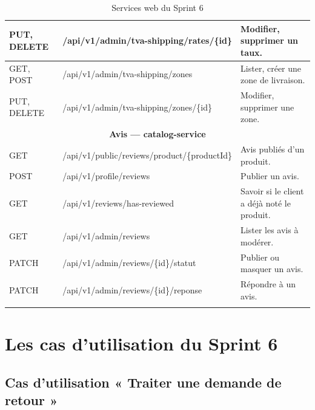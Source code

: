 \begin{longtable}{|p{2cm}|p{8.8cm}|p{4.2cm}|}
\hline
PUT, DELETE & /api/v1/admin/tva-shipping/rates/\{id\} & Modifier, supprimer un taux. \\
\hline
GET, POST & /api/v1/admin/tva-shipping/zones & Lister, créer une zone de livraison. \\
\hline
PUT, DELETE & /api/v1/admin/tva-shipping/zones/\{id\} & Modifier, supprimer une zone. \\
\hline
\multicolumn{3}{|c|}{\textbf{Avis --- catalog-service}} \\
\hline
GET & /api/v1/public/reviews/product/\{productId\} & Avis publiés d'un produit. \\
\hline
POST & /api/v1/profile/reviews & Publier un avis. \\
\hline
GET & /api/v1/reviews/has-reviewed & Savoir si le client a déjà noté le produit. \\
\hline
GET & /api/v1/admin/reviews & Lister les avis à modérer. \\
\hline
PATCH & /api/v1/admin/reviews/\{id\}/statut & Publier ou masquer un avis. \\
\hline
PATCH & /api/v1/admin/reviews/\{id\}/reponse & Répondre à un avis. \\
\hline
\caption{Services web du Sprint 6}
\label{tab:ws-sprint6}
\end{longtable}

\section{Les cas d'utilisation du Sprint 6}
\subsection{Cas d'utilisation « Traiter une demande de retour »}
